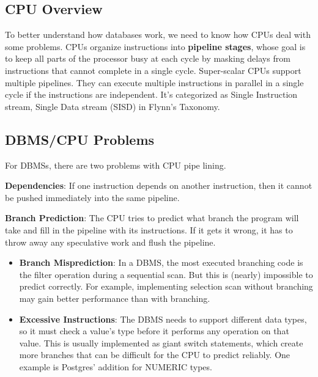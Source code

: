 \documentclass[11pt]{article}
\begin{document}
\subsection*{CPU Overview}
To better understand how databases work, we need to know how CPUs deal with some problems. 
CPUs organize instructions into \textbf{pipeline stages}, whose goal is to keep all parts of the 
processor busy at each cycle by masking delays from instructions that cannot complete in a single 
cycle. Super-scalar CPUs support multiple pipelines. They can execute multiple instructions in 
parallel in a single cycle if the instructions are independent. It's categorized as Single 
Instruction stream, Single Data stream (SISD) in Flynn's Taxonomy.

\subsection*{DBMS/CPU Problems}
For DBMSs, there are two problems with CPU pipe lining. 

\textbf{Dependencies}: If one instruction depends on another instruction, then it cannot be pushed 
immediately into the same pipeline. 

\textbf{Branch Prediction}: The CPU tries to predict what branch the program will take and fill in 
the pipeline with its instructions. If it gets it wrong, it has to throw away any speculative work 
and flush the pipeline. 
\begin{itemize}
    \item \textbf{Branch Misprediction}: 
    In a DBMS, the most executed branching code is the filter operation during a sequential scan. 
    But this is (nearly) impossible to predict correctly. For example, implementing selection scan 
    without branching may gain better performance than with branching.
    \item \textbf{Excessive Instructions}: 
    The DBMS needs to support different data types, so it must check a value's type before it 
    performs any operation on that value. This is usually implemented as giant switch statements, 
    which create more branches that can be difficult for the CPU to predict reliably. One example is 
    Postgres' addition for NUMERIC types.
\end{itemize}
\end{document}
